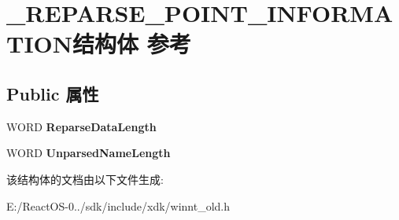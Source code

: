 \hypertarget{struct___r_e_p_a_r_s_e___p_o_i_n_t___i_n_f_o_r_m_a_t_i_o_n}{}\section{\+\_\+\+R\+E\+P\+A\+R\+S\+E\+\_\+\+P\+O\+I\+N\+T\+\_\+\+I\+N\+F\+O\+R\+M\+A\+T\+I\+O\+N结构体 参考}
\label{struct___r_e_p_a_r_s_e___p_o_i_n_t___i_n_f_o_r_m_a_t_i_o_n}
\subsection*{Public 属性}
\begin{DoxyCompactItemize}
\item 
\mbox{\label{struct___r_e_p_a_r_s_e___p_o_i_n_t___i_n_f_o_r_m_a_t_i_o_n_a136f881f98b6d6d35263c31780df1fc7}} 
W\+O\+RD {\bfseries Reparse\+Data\+Length}
\item 
\mbox{\label{struct___r_e_p_a_r_s_e___p_o_i_n_t___i_n_f_o_r_m_a_t_i_o_n_af344886e6684fecc5c29bf175d5b4283}} 
W\+O\+RD {\bfseries Unparsed\+Name\+Length}
\end{DoxyCompactItemize}


该结构体的文档由以下文件生成\+:\begin{DoxyCompactItemize}
\item 
E\+:/\+React\+O\+S-\/0../sdk/include/xdk/winnt\+\_\+old.\+h\end{DoxyCompactItemize}
